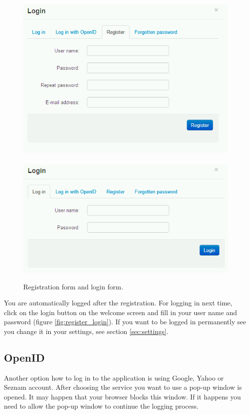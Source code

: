\begin{figure}
\begin{center}
\includegraphics[scale=0.4]{figures/user_manual/register.png}~~~~\includegraphics[scale=0.4]{figures/user_manual/login.png}
\end{center}
\caption{Registration form and login form.}
\end{figure}

You are automatically logged after the registration. For logging in next time, click on the login button on the welcome screen and fill in your user name and password (figure \ref{fig:register_login}). If you want to be logged in permanently see you change it in your settings, see section \ref{sec:settings}.

\subsection{OpenID}

Another option how to log in to the application is using Google, Yahoo or Seznam account. After choosing the service you want to use a pop-up window is opened. It may happen that your browser blocks this window. If it happens you need to allow the pop-up window to continue the logging process.

